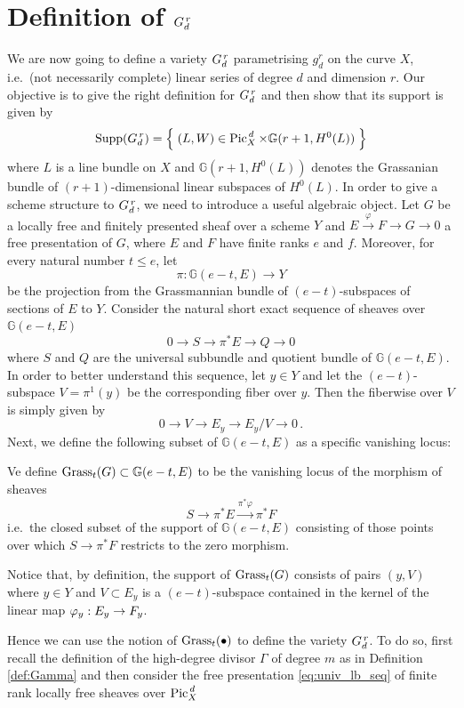 \section{Definition of $G_d^{\,r}$}

	We are now going to define a variety $G_d^{\,r}$ parametrising $g_d^r$ on the curve $X$, i.e.\ (not necessarily complete) linear series of degree $d$ and dimension $r$. Our objective is to give the right definition for $G_d^{\,r}$ and then show that its support is given by
	$$ \operatorname{Supp}(G_d^{\,r}) = \left\{\;  (L,W) \in \operatorname{Pic}^{\,d}_X \times \mathbb{G}(r+1, H^0(L))  \; \right\} $$
	where $L$ is a line bundle on $X$ and $\mathbb{G}(r+1, H^0(L))$ denotes the Grassanian bundle of $(r+1)$-dimensional linear subspaces of $H^0(L)$.
	In order to give a scheme structure to $G_d^{\,r}$, we need to introduce a useful algebraic object. Let $G$ be a locally free and finitely presented sheaf over a scheme $Y$ and $ E\overset{\varphi}\to F \to G \to 0$ a free presentation of $G$, where $E$ and $F$ have finite ranks $e$ and $f$. Moreover, for every natural number $t\leq e$, let
	$$ \pi:\mathbb{G}(e-t, E)\to Y $$ 
	be the projection from the Grassmannian bundle of $(e-t)$-subspaces of sections of $E$ to $Y$.
	Consider the natural short exact sequence of sheaves over $\mathbb{G}(e-t, E)$
	$$ 0\to S \to \pi^* E \to Q \to 0 $$
	where $S$ and $Q$ are the universal subbundle and quotient bundle of $\mathbb{G}(e-t, E)$. 
	In order to better understand this sequence, let $y\in Y$ and let the $(e-t)$-subspace $V=\pi^{1}(y)$ be the corresponding fiber over $y$. Then the fiberwise \ses over $V$ is simply given by
	$$ 0\to V \to E_y \to E_y/V \to 0 \,. $$
	Next, we define the following subset of $\mathbb{G}(e-t, E)$ as a specific vanishing locus:
	\begin{defi}
		Ve define $\operatorname{Grass}_t(G) \subset \mathbb{G}(e-t, E)$ to be the vanishing locus of the morphism of sheaves
		$$ S\longrightarrow \pi^*E \overset{\pi^*\varphi} \longrightarrow \pi^* F $$
		i.e.\ the closed subset of the support of $\mathbb{G}(e-t, E)$ consisting of those points over which $S\to \pi^* F$ restricts to the zero morphism.
	\end{defi}
	\begin{rema}\label{rema:ker}
		Notice that, by definition, the support of $\operatorname{Grass}_t(G)$ consists of pairs $(y, V)$ where $y\in Y$ and $V\subset E_y$ is a $(e-t)$-subspace contained in the kernel of the linear map $\varphi_y: E_y \to F_y$.
	\end{rema}
	Hence we can use the notion of $\operatorname{Grass}_t(\bullet)$ to define the variety $G_d^{\,r}$. To do so, first recall the definition of the high-degree divisor $\Gamma$ of degree $m$ as in Definition \ref{def:Gamma} and then consider the free presentation \eqref{eq:univ_lb_seq} of finite rank locally free sheaves over $\operatorname{Pic}^{\,d}_X$
